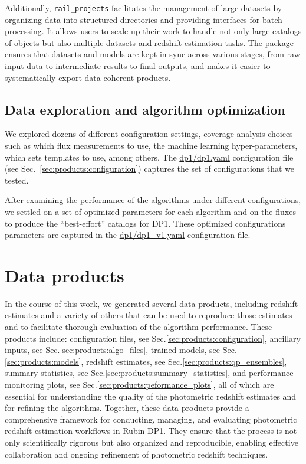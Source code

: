Additionally, \texttt{rail\_projects} facilitates the management of large datasets by organizing data into structured directories and providing interfaces for batch processing.  It allows users to scale up their work to handle not only large catalogs of objects but also multiple datasets and redshift estimation tasks.  The package ensures that datasets and models are kept in sync across various stages, from raw input data to intermediate results to final outputs, and makes it easier to systematically export data coherent products.


\subsection{Data exploration and algorithm optimization}
\label{sec:method:optimization}

We explored dozens of different configuration settings, coverage analysis choices such as which flux measurements to use, the machine learning hyper-parameters, which sets templates to use, among others.   The \href{https://github.com/LSSTDESC/rail_project_config/blob/main/dp1/dp1.yaml}{dp1/dp1.yaml} configuration file (see Sec.~\ref{sec:products:configuration}) captures the set of configurations that we tested.  

After examining the performance of the algorithms under different configurations, we settled on a set of optimized parameters for each algorithm and on the  fluxes to produce the ``best-effort'' catalogs for DP1.   These optimized configurations parameters are captured in the \href{https://github.com/LSSTDESC/rail_project_config/blob/main/dp1/dp1.yaml}{dp1/dp1\_v1.yaml} configuration file.


\section{Data products}
\label{sec:products:0}

In the course of this work, we generated several data products, including redshift estimates and a variety of others that can be used to reproduce those estimates and to facilitate thorough evaluation of the algorithm performance.  These products include: configuration files, see Sec.\ref{sec:products:configuration}, ancillary inputs, see Sec.\ref{sec:products:algo_files}, trained models, see Sec.\ref{sec:products:models}, redshift estimates, see Sec.\ref{sec:products:qp_ensembles}, summary statistics,  see Sec.\ref{sec:products:summary_statistics}, and performance monitoring plots, see Sec.\ref{sec:products:peformance_plots}, all of which are essential for understanding the quality of the photometric redshift estimates and for refining the algorithms.   Together, these data products provide a comprehensive framework for conducting, managing, and evaluating photometric redshift estimation workflows in Rubin DP1.  They ensure that the process is not only scientifically rigorous but also organized and reproducible, enabling effective collaboration and ongoing refinement of photometric redshift techniques.


